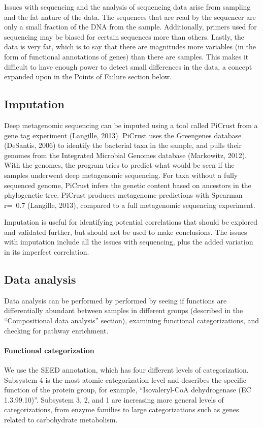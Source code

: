 Issues with sequencing and the analysis of sequencing data arise from sampling and the fat nature of the data. The sequences that are read by the sequencer are only a small fraction of the DNA from the sample. Additionally, primers used for sequencing may be biased for certain sequences more than others. Lastly, the data is very fat, which is to say that there are magnitudes more variables (in the form of functional annotations of genes) than there are samples. This makes it difficult to have enough power to detect small differences in the data, a concept expanded upon in the Points of Failure section below.

\subsection{Imputation}
Deep metagenomic sequencing can be imputed using a tool called PiCrust from a gene tag experiment (Langille, 2013). PiCrust uses the Greengenes database (DeSantis, 2006) to identify the bacterial taxa in the sample, and pulls their genomes from the Integrated Microbial Genomes database (Markowitz, 2012). With the genomes, the program tries to predict what would be seen if the samples underwent deep metagenomic sequencing. For taxa without a fully sequenced genome, PiCrust infers the genetic content based on ancestors in the phylogenetic tree. PiCrust produces metagenome predictions with Spearman r=~0.7 (Langille, 2013), compared to a full metagenomic sequencing experiment.

Imputation is useful for identifying potential correlations that should be explored and validated further, but should not be used to make conclusions. The issues with imputation include all the issues with sequencing, plus the added variation in its imperfect correlation.

\subsection{Data analysis}
Data analysis can be performed by performed by seeing if functions are differentially abundant between samples in different groups (described in the “Compositional data analysis” section), examining functional categorizations, and checking for pathway enrichment.

\paragraph{Functional categorization}
We use the SEED annotation, which has four different levels of categorization. Subsystem 4 is the most atomic categorization level and describes the specific function of the protein group, for example, “Isovaleryl-CoA dehydrogenase (EC 1.3.99.10)”. Subsystem 3, 2, and 1 are increasing more general levels of categorizations, from enzyme families to large categorizations such as genes related to carbohydrate metabolism.

